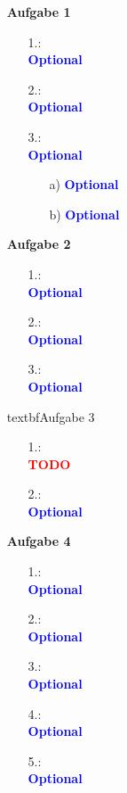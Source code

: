 \documentclass[a4paper,11pt]{scrartcl}
\title{\titleinfo}
\author{\authorinfo}
\newcommand{\todo}{\textcolor{red}{\textbf{TODO}}}
\newcommand{\opt}{\textcolor{blue}{\textbf{Optional}}}
\begin{document}
\maketitle
\begin{enumerate}
	\item[\textbf{Aufgabe 1}]\quad \\
	\begin{enumerate}
		\item[1.:]\quad \\
		\opt
		\item[2.:]\quad \\
		\opt
		\item[3.:]\quad \\
		\opt
		\begin{enumerate}
			\item[a)]
			\opt
			\item[b)]
			\opt
		\end{enumerate}
	\end{enumerate}
	\item[\textbf{Aufgabe 2}]\quad \\
	\begin{enumerate}
		\item[1.:]\quad \\
		\opt
		\item[2.:]\quad \\
		\opt
		\item[3.:]\quad \\
		\opt
	\end{enumerate}
	\item[textbf{Aufgabe 3}]\quad \\
	\begin{enumerate}
		\item[1.:]\quad \\
		\todo
		\item[2.:]\quad \\
		\opt
	\end{enumerate}
	\item[\textbf{Aufgabe 4}]\quad \\
	\begin{enumerate}
		\item[1.:]\quad \\
		\opt
		\item[2.:]\quad \\
		\opt
		\item[3.:]\quad \\
		\opt
		\item[4.:]\quad \\
		\opt
		\item[5.:]\quad \\
		\opt
	\end{enumerate}
\end{enumerate}
\end{document}
